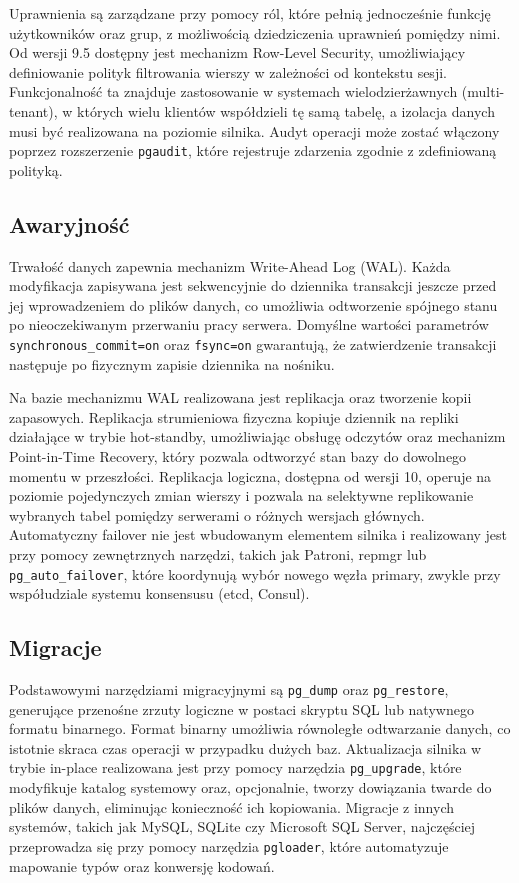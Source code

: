 Uprawnienia są zarządzane przy pomocy ról, które pełnią jednocześnie funkcję
użytkowników oraz grup, z możliwością dziedziczenia uprawnień pomiędzy nimi.
Od wersji 9.5 dostępny jest mechanizm Row-Level Security, umożliwiający
definiowanie polityk filtrowania wierszy w zależności od kontekstu sesji.
Funkcjonalność ta znajduje zastosowanie w systemach wielodzierżawnych
(multi-tenant), w których wielu klientów współdzieli tę samą tabelę, a izolacja
danych musi być realizowana na poziomie silnika. Audyt operacji może zostać
włączony poprzez rozszerzenie \texttt{pgaudit}, które rejestruje zdarzenia
zgodnie z zdefiniowaną polityką.

\subsection{Awaryjność}

Trwałość danych zapewnia mechanizm Write-Ahead Log (WAL). Każda modyfikacja
zapisywana jest sekwencyjnie do dziennika transakcji jeszcze przed jej
wprowadzeniem do plików danych, co umożliwia odtworzenie spójnego stanu po
nieoczekiwanym przerwaniu pracy serwera. Domyślne wartości parametrów
\texttt{synchronous\_commit=on} oraz \texttt{fsync=on} gwarantują, że
zatwierdzenie transakcji następuje po fizycznym zapisie dziennika na nośniku.

Na bazie mechanizmu WAL realizowana jest replikacja oraz tworzenie kopii
zapasowych. Replikacja strumieniowa fizyczna kopiuje dziennik na repliki
działające w trybie hot-standby, umożliwiając obsługę odczytów oraz
mechanizm Point-in-Time Recovery, który pozwala odtworzyć stan bazy do
dowolnego momentu w przeszłości. Replikacja logiczna, dostępna od wersji 10,
operuje na poziomie pojedynczych zmian wierszy i pozwala na selektywne
replikowanie wybranych tabel pomiędzy serwerami o różnych wersjach głównych.
Automatyczny failover nie jest wbudowanym elementem silnika i realizowany
jest przy pomocy zewnętrznych narzędzi, takich jak Patroni, repmgr lub
\texttt{pg\_auto\_failover}, które koordynują wybór nowego węzła primary,
zwykle przy współudziale systemu konsensusu (etcd, Consul).

\subsection{Migracje}

Podstawowymi narzędziami migracyjnymi są \texttt{pg\_dump} oraz
\texttt{pg\_restore}, generujące przenośne zrzuty logiczne w postaci skryptu
SQL lub natywnego formatu binarnego. Format binarny umożliwia równoległe
odtwarzanie danych, co istotnie skraca czas operacji w przypadku dużych baz.
Aktualizacja silnika w trybie in-place realizowana jest przy pomocy narzędzia
\texttt{pg\_upgrade}, które modyfikuje katalog systemowy oraz, opcjonalnie,
tworzy dowiązania twarde do plików danych, eliminując konieczność ich kopiowania.
Migracje z innych systemów, takich jak MySQL, SQLite czy Microsoft SQL Server,
najczęściej przeprowadza się przy pomocy narzędzia \texttt{pgloader}, które
automatyzuje mapowanie typów oraz konwersję kodowań.

